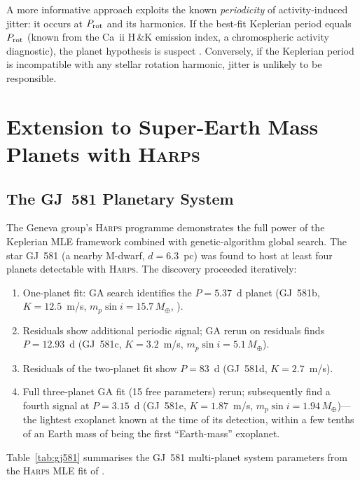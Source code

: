 \documentclass[12pt]{article}
\begin{document}
A more informative approach exploits the known \emph{periodicity} of
activity-induced jitter: it occurs at $P_{\rm rot}$ and its harmonics.
If the best-fit Keplerian period equals $P_{\rm rot}$ (known from the
Ca~{\sc ii} H\,\&K emission index, a chromospheric activity diagnostic),
the planet hypothesis is suspect \citep{Queloz2001}.  Conversely, if
the Keplerian period is incompatible with any stellar rotation harmonic,
jitter is unlikely to be responsible.

\section{Extension to Super-Earth Mass Planets with \textsc{Harps}}
\label{sec:harps}

\subsection{The GJ~581 Planetary System}

The Geneva group's \textsc{Harps} programme demonstrates the full
power of the Keplerian MLE framework combined with genetic-algorithm
global search.  The star GJ~581 (a nearby M-dwarf, $d = 6.3$~pc) was
found to host at least four planets detectable with \textsc{Harps}.
The discovery proceeded iteratively:
\begin{enumerate}
  \item One-planet fit: GA search identifies the $P = 5.37$~d planet
    (GJ~581b, $K = 12.5$~m/s, $m_p\sin i = 15.7\,M_\oplus$,
    \citealt{Bonfils2005}).
  \item Residuals show additional periodic signal; GA rerun on
    residuals finds $P = 12.93$~d (GJ~581c, $K = 3.2$~m/s,
    $m_p\sin i = 5.1\,M_\oplus$).
  \item Residuals of the two-planet fit show $P = 83$~d (GJ~581d,
    $K = 2.7$~m/s).
  \item Full three-planet GA fit (15 free parameters) rerun;
    subsequently \citet{Mayor2009} find a fourth signal at $P = 3.15$~d
    (GJ~581e, $K = 1.87$~m/s, $m_p\sin i = 1.94\,M_\oplus$)---the
    lightest exoplanet known at the time of its detection, within a few
    tenths of an Earth mass of being the first ``Earth-mass'' exoplanet.
\end{enumerate}

Table~\ref{tab:gj581} summarises the GJ~581 multi-planet system
parameters from the \textsc{Harps} MLE fit of \citet{Mayor2009}.
\end{document}
